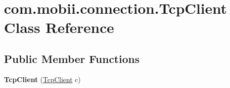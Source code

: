 \hypertarget{classcom_1_1mobii_1_1connection_1_1_tcp_client}{\section{com.\-mobii.\-connection.\-Tcp\-Client Class Reference}
\label{classcom_1_1mobii_1_1connection_1_1_tcp_client}
}
\subsection*{Public Member Functions}
\begin{DoxyCompactItemize}
\item 
\hypertarget{classcom_1_1mobii_1_1connection_1_1_tcp_client_a706da2c3032cc3f07897e586e33041ba}{{\bfseries Tcp\-Client} (\hyperlink{classcom_1_1mobii_1_1connection_1_1_tcp_client}{Tcp\-Client} c)}\label{classcom_1_1mobii_1_1connection_1_1_tcp_client_a706da2c3032cc3f07897e586e33041ba}


\end{DoxyCompactItemize}

